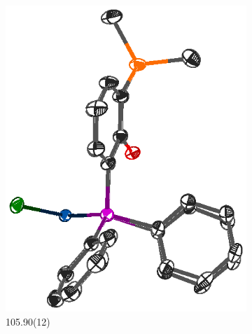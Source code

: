 \begin{figure}[htbp]
        \centering
        \begin{subfigure}[b]{0.3\textwidth}
                \includegraphics[width=\textwidth]{../Othercrystals/PtCl2/630063side.eps}
                \caption{105.90(12)\degrees}
                \label{PtCl2SiPhside}
        \end{subfigure}%
        ~ 
        \begin{subfigure}[b]{0.25\textwidth}

\end{subfigure}
\end{figure}
